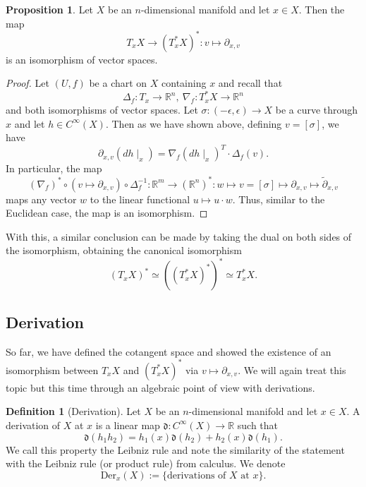 \documentclass[]{article}
\theoremstyle{definition}
\theoremstyle{definition}
\newtheorem{definition}{Definition}[section]
\newtheorem{proposition}{Proposition}[section]
\begin{document}
\begin{proposition}
  Let \(X\) be an \(n\)-dimensional manifold and let \(x \in X\). Then the 
  map 
  \[T_x X \to (T^*_x X)^* : v \mapsto \partial_{x, v}\]
  is an isomorphism of vector spaces.
\end{proposition}
\begin{proof}
  Let \((U, f)\) be a chart on \(X\) containing \(x\) and recall that 
  \[\Delta_f : T_x \to \mathbb{R}^n, \ \nabla_f : T^*_x X \to \mathbb{R}^n\]
  and both isomorphisms of vector spaces. Let \(\sigma : (-\epsilon, \epsilon) 
  \to X\) be a curve through \(x\) and let \(h \in C^\infty(X)\). Then 
  as we have shown above, defining \(v = [\sigma]\), we have
  \[\partial_{x, v}(dh\mid_x) = \nabla_f(dh\mid_x)^T \cdot \Delta_f(v).\]
  In particular, the map 
  \[ (\nabla_f)^* \circ (v \mapsto \partial_{x, v}) \circ \Delta_f^{-1}:
    \mathbb{R}^m \to (\mathbb{R}^n)^* : w \mapsto v = [\sigma] \mapsto 
    \partial_{x, v} \mapsto \tilde \partial_{x, v}\]
  maps any vector \(w\) to the linear functional \(u \mapsto u \cdot w\). 
  Thus, similar to the Euclidean case, the map is an isomorphism.
\end{proof}

With this, a similar conclusion can be made by taking the dual on both 
sides of the isomorphism, obtaining the canonical isomorphism
\[(T_x X)^* \simeq ((T^*_x X)^*)^* \simeq T^*_x X.\]

\subsection{Derivation}

So far, we have defined the cotangent space and showed the existence of an 
isomorphism between \(T_x X\) and \((T_x^* X)^*\) via \(v \mapsto \partial_{x, v}\).
We will again treat this topic but this time through an algebraic point of view 
with derivations.

\begin{definition}[Derivation]
  Let \(X\) be an \(n\)-dimensional manifold and let \(x \in X\). A derivation 
  of \(X\) at \(x\) is a linear map \(\mathfrak{d} : C^\infty(X) \to \mathbb{R}\) 
  such that 
  \[\mathfrak{d}(h_1 h_2) = h_1(x)\mathfrak{d}(h_2) + h_2(x)\mathfrak{d}(h_1).\]
  We call this property the Leibniz rule and note the similarity of the statement 
  with the Leibniz rule (or product rule) from calculus. We denote 
  \[\text{Der}_x(X) := \{\text{derivations of } X \text{ at } x\}.\]
\end{definition}
\end{document}
